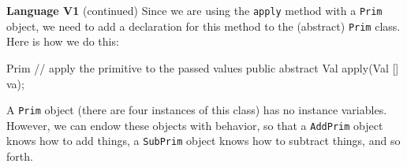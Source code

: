 \begin{minipage}[t]{\sw}
\slidenumber
\LARGE
{\bf Language V1} (continued)\exx
Since we are using the \verb'apply' method with a \verb'Prim' object,
we need to add a declaration for this method
to the (abstract) \verb'Prim' class.
Here is how we do this:
\begin{qv}
Prim
    // apply the primitive to the passed values
    public abstract Val apply(Val [] va);
\end{qv}
A \verb'Prim' object (there are four instances of this class)
has no instance variables.
However, we can endow these objects with behavior,
so that a \verb'AddPrim' object knows how to add things,
a \verb'SubPrim' object knows how to subtract things,
and so forth.\exx
\end{minipage}
